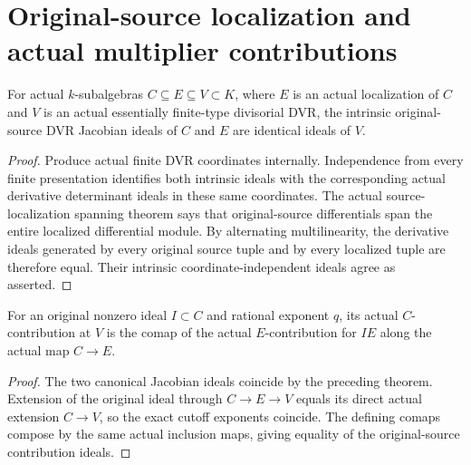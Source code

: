 \section{Original-source localization and actual multiplier contributions}

\begin{theorem}\label{thm:sc0-intrinsic-canonical-source-localization}
\leanok
For actual $k$-subalgebras $C\subseteq E\subseteq V\subset K$, where
$E$ is an actual localization of $C$ and $V$ is an actual essentially
finite-type divisorial DVR, the intrinsic original-source DVR Jacobian
ideals of $C$ and $E$ are identical ideals of $V$.
\end{theorem}
\begin{proof}
Produce actual finite DVR coordinates internally. Independence from
every finite presentation identifies both intrinsic ideals with the
corresponding actual derivative determinant ideals in these same
coordinates. The actual source-localization spanning theorem says
that original-source differentials span the entire localized
differential module. By alternating multilinearity, the derivative
ideals generated by every original source tuple and by every localized
tuple are therefore equal. Their intrinsic coordinate-independent
ideals agree as asserted.
\end{proof}

\begin{corollary}\label{cor:sc0-intrinsic-multiplier-source-localization}
\leanok
{}
For an original nonzero ideal $I\subset C$ and rational exponent $q$,
its actual $C$-contribution at $V$ is the comap of the actual
$E$-contribution for $IE$ along the actual map $C\to E$.
\end{corollary}
\begin{proof}
The two canonical Jacobian ideals coincide by the preceding theorem.
Extension of the original ideal through $C\to E\to V$ equals its
direct actual extension $C\to V$, so the exact cutoff exponents
coincide. The defining comaps compose by the same actual inclusion
maps, giving equality of the original-source contribution ideals.
\end{proof}

